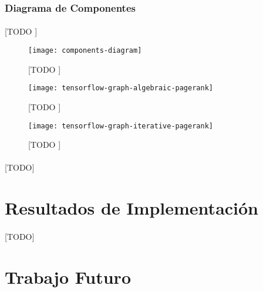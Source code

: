 \documentclass{subfiles}
\begin{document}
        \subsubsection{Diagrama de Componentes}
        \label{sec:components_diagram}

          \paragraph{}
          [TODO ]

          \begin{figure}
            \centering
            \texttt{[image: components-diagram]}
            \caption{[TODO ]}
            \label{img:components_diagram}
          \end{figure}

        \begin{figure}
          \centering
          \texttt{[image: tensorflow-graph-algebraic-pagerank]}
          \caption{[TODO ]}
          \label{img:pagerank_algebraic_diagram}
        \end{figure}

        \begin{figure}
          \centering
          \texttt{[image: tensorflow-graph-iterative-pagerank]}
          \caption{[TODO ]}
          \label{img:pagerank_iterative_diagram}
        \end{figure}
        
      \paragraph{}
      [TODO]

    \section{Resultados de Implementación}
    \label{sec:implementation_results}

      \paragraph{}
      [TODO]

    \section{Trabajo Futuro}
    \label{sec:future_work}
\end{document}
